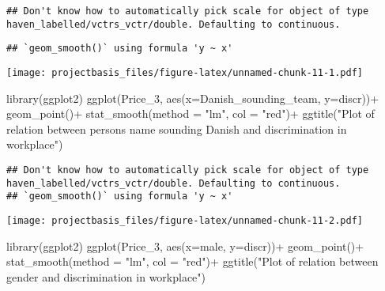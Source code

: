 \documentclass[
]{article}
\newenvironment{Shaded}{\begin{snugshade}}{\end{snugshade}}
\newcommand{\AttributeTok}[1]{\textcolor[rgb]{0.77,0.63,0.00}{#1}}
\newcommand{\FunctionTok}[1]{\textcolor[rgb]{0.00,0.00,0.00}{#1}}
\newcommand{\NormalTok}[1]{#1}
\newcommand{\SpecialCharTok}[1]{\textcolor[rgb]{0.00,0.00,0.00}{#1}}
\newcommand{\StringTok}[1]{\textcolor[rgb]{0.31,0.60,0.02}{#1}}
\begin{document}
\begin{verbatim}
## Don't know how to automatically pick scale for object of type haven_labelled/vctrs_vctr/double. Defaulting to continuous.
\end{verbatim}

\begin{verbatim}
## `geom_smooth()` using formula 'y ~ x'
\end{verbatim}

\texttt{[image: projectbasis\_files/figure-latex/unnamed-chunk-11-1.pdf]}

\begin{Shaded}
\begin{Highlighting}[]
\FunctionTok{library}\NormalTok{(ggplot2)}
\FunctionTok{ggplot}\NormalTok{(Price\_3, }\FunctionTok{aes}\NormalTok{(}\AttributeTok{x=}\NormalTok{Danish\_sounding\_team, }\AttributeTok{y=}\NormalTok{discr))}\SpecialCharTok{+}
  \FunctionTok{geom\_point}\NormalTok{()}\SpecialCharTok{+}
  \FunctionTok{stat\_smooth}\NormalTok{(}\AttributeTok{method =} \StringTok{"lm"}\NormalTok{, }\AttributeTok{col =} \StringTok{"red"}\NormalTok{)}\SpecialCharTok{+}
   \FunctionTok{ggtitle}\NormalTok{(}\StringTok{"Plot of relation between person\textquotesingle{}s name sounding Danish and discrimination in workplace"}\NormalTok{)}
\end{Highlighting}
\end{Shaded}

\begin{verbatim}
## Don't know how to automatically pick scale for object of type haven_labelled/vctrs_vctr/double. Defaulting to continuous.
## `geom_smooth()` using formula 'y ~ x'
\end{verbatim}

\texttt{[image: projectbasis\_files/figure-latex/unnamed-chunk-11-2.pdf]}

\begin{Shaded}
\begin{Highlighting}[]
\FunctionTok{library}\NormalTok{(ggplot2)}
\FunctionTok{ggplot}\NormalTok{(Price\_3, }\FunctionTok{aes}\NormalTok{(}\AttributeTok{x=}\NormalTok{male, }\AttributeTok{y=}\NormalTok{discr))}\SpecialCharTok{+}
  \FunctionTok{geom\_point}\NormalTok{()}\SpecialCharTok{+}
  \FunctionTok{stat\_smooth}\NormalTok{(}\AttributeTok{method =} \StringTok{"lm"}\NormalTok{, }\AttributeTok{col =} \StringTok{"red"}\NormalTok{)}\SpecialCharTok{+}
   \FunctionTok{ggtitle}\NormalTok{(}\StringTok{"Plot of relation between gender and discrimination in workplace"}\NormalTok{)}
\end{Highlighting}
\end{Shaded}
\end{document}
